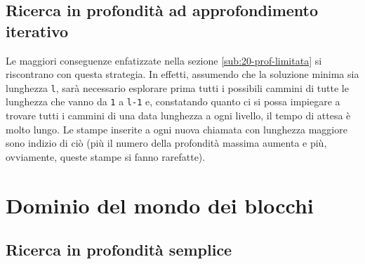 \subsection{Ricerca in profondità ad approfondimento iterativo} \label{sub:20-prof-it}
Le maggiori conseguenze enfatizzate nella sezione \ref{sub:20-prof-limitata} si riscontrano con questa strategia. In effetti, assumendo che la soluzione minima sia lunghezza \texttt{l}, sarà necessario esplorare prima tutti i possibili cammini di tutte le lunghezza che vanno da \texttt{1} a \texttt{l-1} e, constatando quanto ci si possa impiegare a trovare tutti i cammini di una data lunghezza a ogni livello, il tempo di attesa è molto lungo. Le stampe inserite a ogni nuova chiamata con lunghezza maggiore sono indizio di ciò (più il numero della profondità massima aumenta e più, ovviamente, queste stampe si fanno rarefatte).

\section{Dominio del mondo dei blocchi}
\subsection{Ricerca in profondità semplice} \label{sub:blocchi-prof-semplice}
